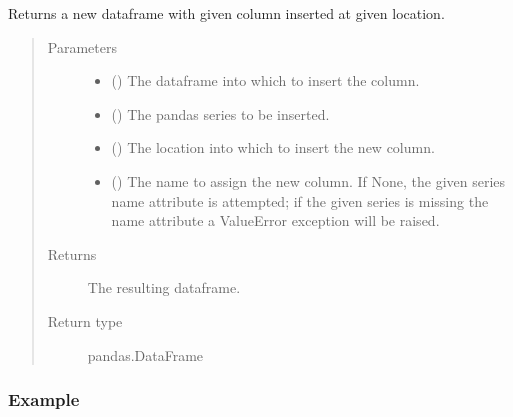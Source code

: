 \documentclass[letterpaper,10pt,english]{sphinxmanual}
\begin{document}
\begin{fulllineitems}
\label{\detokenize{dalio.util:dalio.util.out_of_place_col_insert}}
Returns a new dataframe with given column inserted at given location.
\begin{quote}\begin{description}
\item[{Parameters}] \leavevmode\begin{itemize}
\item {} 
 () \textendash{} The dataframe into which to insert the column.

\item {} 
 () \textendash{} The pandas series to be inserted.

\item {} 
 () \textendash{} The location into which to insert the new column.

\item {} 
 (\sphinxstyleliteralemphasis{\sphinxupquote{, }}) \textendash{} The name to assign the new column. If None, the given series name
attribute is attempted; if the given series is missing the name
attribute a ValueError exception will be raised.

\end{itemize}

\item[{Returns}] \leavevmode
The resulting dataframe.

\item[{Return type}] \leavevmode
pandas.DataFrame

\end{description}\end{quote}
\subsubsection*{Example}


\end{fulllineitems}
\end{document}
